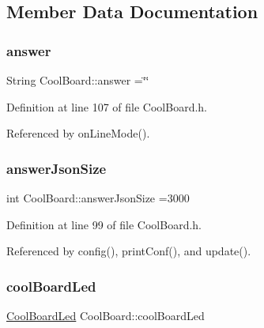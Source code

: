 \subsection{Member Data Documentation}
\mbox{\label{classCoolBoard_a7b835fafd449e5282f7f91d787a2dc15}} 
\subsubsection{\texorpdfstring{answer}{answer}}
{\footnotesize\ttfamily String Cool\+Board\+::answer =\char`\"{}\char`\"{}\hspace{0.3cm}{\ttfamily [private]}}



Definition at line 107 of file Cool\+Board.\+h.



Referenced by on\+Line\+Mode().

\mbox{\label{classCoolBoard_af2da1f85315b3d074a8b87d158094fb7}} 
\subsubsection{\texorpdfstring{answer\+Json\+Size}{answerJsonSize}}
{\footnotesize\ttfamily int Cool\+Board\+::answer\+Json\+Size =3000\hspace{0.3cm}{\ttfamily [private]}}



Definition at line 99 of file Cool\+Board.\+h.



Referenced by config(), print\+Conf(), and update().

\mbox{\label{classCoolBoard_a1b1d3c684a5baa56b08486e192fd8e97}} 
\subsubsection{\texorpdfstring{cool\+Board\+Led}{coolBoardLed}}
{\footnotesize\ttfamily \hyperlink{classCoolBoardLed}{Cool\+Board\+Led} Cool\+Board\+::cool\+Board\+Led\hspace{0.3cm}{\ttfamily [private]}}



